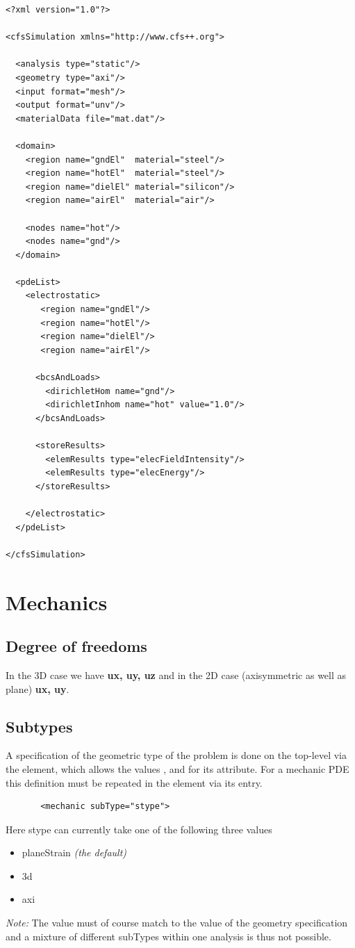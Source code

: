 {\footnotesize
\begin{verbatim}
<?xml version="1.0"?>

<cfsSimulation xmlns="http://www.cfs++.org">

  <analysis type="static"/>
  <geometry type="axi"/>
  <input format="mesh"/>
  <output format="unv"/>
  <materialData file="mat.dat"/>

  <domain>
    <region name="gndEl"  material="steel"/>
    <region name="hotEl"  material="steel"/>
    <region name="dielEl" material="silicon"/>
    <region name="airEl"  material="air"/>

    <nodes name="hot"/>
    <nodes name="gnd"/>
  </domain>

  <pdeList>
    <electrostatic>
       <region name="gndEl"/>
       <region name="hotEl"/>
       <region name="dielEl"/>
       <region name="airEl"/>

      <bcsAndLoads>
        <dirichletHom name="gnd"/>
        <dirichletInhom name="hot" value="1.0"/>
      </bcsAndLoads>

      <storeResults>
        <elemResults type="elecFieldIntensity"/>
        <elemResults type="elecEnergy"/>
      </storeResults>

    </electrostatic>
  </pdeList>

</cfsSimulation>
\end{verbatim}
}


\newpage
\section{Mechanics}
\subsection{Degree of freedoms}
In the 3D case we have {\bf ux, uy, uz} and in the 2D case
(axisymmetric as well as plane) {\bf ux, uy}.


\subsection{Subtypes}
%
%
A specification of the geometric type of the problem is done on the top-level
via the  element, which allows the values , 
and  for its  attribute. For a mechanic PDE this definition
must be repeated in the  element via its  entry.
\begin{verbatim}
       <mechanic subType="stype">
\end{verbatim}
\noindent Here stype can currently take one of the following three values
%
%
\begin{itemize}
\item planeStrain \emph{(the default)}
\item 3d
\item axi
\end{itemize}
%
%
\emph{Note:} The  value must of course match to the 
value of the geometry specification and a mixture of different subTypes within
one analysis is thus not possible.
%
%
